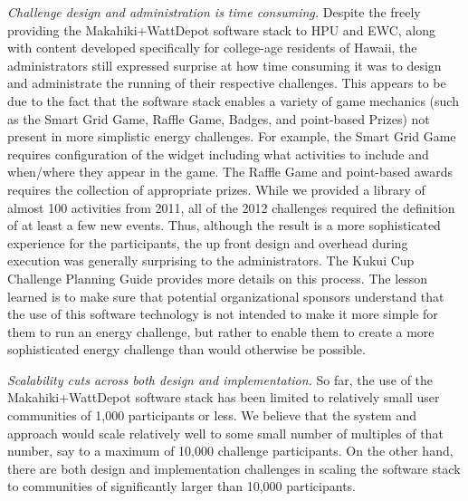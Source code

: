 {\em Challenge design and administration is time consuming.} Despite the freely providing the Makahiki+WattDepot software stack to HPU and EWC, along with content developed specifically for college-age residents of Hawaii, the administrators still expressed surprise at how time consuming it was to design and administrate the running of their respective challenges.  This appears to be due to the fact that the software stack enables a variety of game mechanics (such as the Smart Grid Game, Raffle Game, Badges, and point-based Prizes) not present in more simplistic energy challenges.  For example, the Smart Grid Game requires configuration of the widget including what activities to include and when/where they appear in the game.  The Raffle Game and point-based awards requires the collection of appropriate prizes. While we provided a library of almost 100 activities from 2011, all of the 2012 challenges required the definition of at least a few new events.  Thus, although the result is a more sophisticated experience for the participants, the up front design and overhead during execution was generally surprising to the administrators. The Kukui Cup Challenge Planning Guide \cite{KukuiCupChallengePlanningGuide} provides more details on this process.  The lesson learned is to make sure that potential organizational sponsors understand that the use of this software technology is not intended to make it more simple for them to run an energy challenge, but rather to enable them to create a more sophisticated energy challenge than would otherwise be possible.

{\em Scalability cuts across both design and implementation.}  So far, the use of the Makahiki+WattDepot software stack has been limited to relatively small user communities of 1,000 participants or less.  We believe that the system and approach would scale relatively well to some small number of multiples of that number, say to a maximum of 10,000 challenge participants.  On the other hand, there are both design and implementation challenges in scaling the software stack to communities of significantly larger than 10,000 participants.

